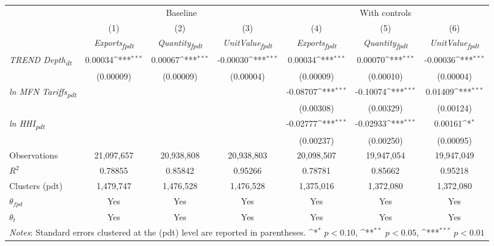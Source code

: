 {
\def\sym#1{\ifmmode^{#1}\else\(^{#1}\)\fi}
\begin{tabular}{l*{6}{c}}
\toprule
&\multicolumn{3}{c}{Baseline}&\multicolumn{3}{c}{With controls}\\\cmidrule(lr){2-4}\cmidrule(lr){5-7}
&(1)&(2)&(3)&(4)&(5)&(6)\\
&\textit{Exports\textsubscript{fpdt}}&\textit{Quantity\textsubscript{fpdt}}&\textit{UnitValue\textsubscript{fpdt}}&\textit{Exports\textsubscript{fpdt}}&\textit{Quantity\textsubscript{fpdt}}&\textit{UnitValue\textsubscript{fpdt}}\\
\midrule
\textit{TREND Depth\textsubscript{dt}} & 0.00034\sym{***} & 0.00067\sym{***} & -0.00030\sym{***} & 0.00034\sym{***} & 0.00070\sym{***} & -0.00036\sym{***}\\
 & (0.00009) & (0.00009) & (0.00004) & (0.00009) & (0.00010) & (0.00004)\\
\addlinespace
\textit{ln MFN Tariffs\textsubscript{pdt}} &  &  &  & -0.08707\sym{***} & -0.10074\sym{***} & 0.01409\sym{***}\\
 &  &  &  & (0.00308) & (0.00329) & (0.00124)\\
\addlinespace
\textit{ln HHI\textsubscript{pdt}} &  &  &  & -0.02777\sym{***} & -0.02933\sym{***} & 0.00161\sym{*}\\
 &  &  &  & (0.00237) & (0.00250) & (0.00095)\\
\midrule
Observations & 21,097,657 & 20,938,808 & 20,938,803 & 20,098,507 & 19,947,054 & 19,947,049\\
$R^{2}$ & 0.78855 & 0.85842 & 0.95266 & 0.78781 & 0.85662 & 0.95218\\
Clusters (pdt) & 1,479,747 & 1,476,528 & 1,476,528 & 1,375,016 & 1,372,080 & 1,372,080\\
$\theta_{fpd}$ & Yes & Yes & Yes & Yes & Yes & Yes\\
$\theta_{t}$ & Yes & Yes & Yes & Yes & Yes & Yes\\
\bottomrule
\multicolumn{7}{l}{\footnotesize \textit{Notes}: Standard errors clustered at the (pdt) level are reported in parentheses. \sym{*} \(p<0.10\), \sym{**} \(p<0.05\), \sym{***} \(p<0.01\)}\\
\end{tabular}
}
